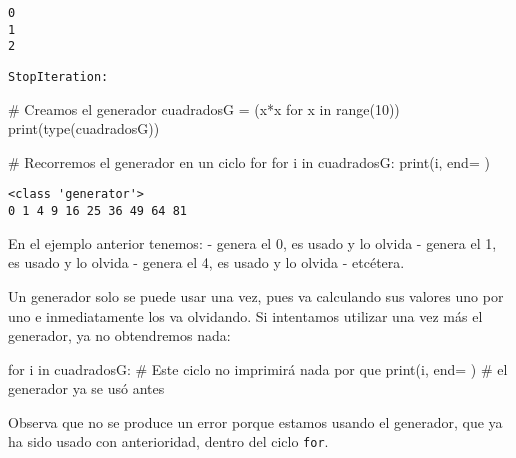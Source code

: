 \documentclass[
  letterpaper,
  DIV=11,
  numbers=noendperiod]{scrreprt}
\newenvironment{Shaded}{\begin{snugshade}}{\end{snugshade}}
\newcommand{\BuiltInTok}[1]{\textcolor[rgb]{0.00,0.23,0.31}{#1}}
\newcommand{\CommentTok}[1]{\textcolor[rgb]{0.37,0.37,0.37}{#1}}
\newcommand{\ControlFlowTok}[1]{\textcolor[rgb]{0.00,0.23,0.31}{#1}}
\newcommand{\DecValTok}[1]{\textcolor[rgb]{0.68,0.00,0.00}{#1}}
\newcommand{\KeywordTok}[1]{\textcolor[rgb]{0.00,0.23,0.31}{#1}}
\newcommand{\NormalTok}[1]{\textcolor[rgb]{0.00,0.23,0.31}{#1}}
\newcommand{\OperatorTok}[1]{\textcolor[rgb]{0.37,0.37,0.37}{#1}}
\newcommand{\StringTok}[1]{\textcolor[rgb]{0.13,0.47,0.30}{#1}}
\begin{document}
\begin{verbatim}
0
1
2
\end{verbatim}

\begin{verbatim}
StopIteration: 
\end{verbatim}

\begin{Shaded}
\begin{Highlighting}[]
\CommentTok{\# Creamos el generador}
\NormalTok{cuadradosG }\OperatorTok{=}\NormalTok{ (x}\OperatorTok{*}\NormalTok{x }\ControlFlowTok{for}\NormalTok{ x }\KeywordTok{in} \BuiltInTok{range}\NormalTok{(}\DecValTok{10}\NormalTok{))}
\BuiltInTok{print}\NormalTok{(}\BuiltInTok{type}\NormalTok{(cuadradosG))}

\CommentTok{\# Recorremos el generador en un ciclo for}
\ControlFlowTok{for}\NormalTok{ i }\KeywordTok{in}\NormalTok{ cuadradosG:}
    \BuiltInTok{print}\NormalTok{(i, end}\OperatorTok{=}\StringTok{\textquotesingle{} \textquotesingle{}}\NormalTok{)}
\end{Highlighting}
\end{Shaded}

\begin{verbatim}
<class 'generator'>
0 1 4 9 16 25 36 49 64 81 
\end{verbatim}

En el ejemplo anterior tenemos: - genera el 0, es usado y lo olvida -
genera el 1, es usado y lo olvida - genera el 4, es usado y lo olvida -
etcétera.

Un generador solo se puede usar una vez, pues va calculando sus valores
uno por uno e inmediatamente los va olvidando. Si intentamos utilizar
una vez más el generador, ya no obtendremos nada:

\begin{Shaded}
\begin{Highlighting}[]
\ControlFlowTok{for}\NormalTok{ i }\KeywordTok{in}\NormalTok{ cuadradosG:    }\CommentTok{\# Este ciclo no imprimirá nada por que}
    \BuiltInTok{print}\NormalTok{(i, end}\OperatorTok{=}\StringTok{\textquotesingle{} \textquotesingle{}}\NormalTok{)   }\CommentTok{\# el generador ya se usó antes}
\end{Highlighting}
\end{Shaded}

Observa que no se produce un error porque estamos usando el generador,
que ya ha sido usado con anterioridad, dentro del ciclo \texttt{for}.

\end{document}
